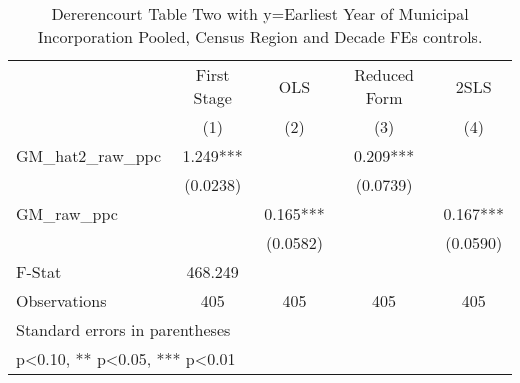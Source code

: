 \begin{table}[htbp]\centering
\def\sym#1{\ifmmode^{#1}\else\(^{#1}\)\fi}
\caption{Dererencourt Table Two with y=Earliest Year of Municipal Incorporation  Pooled, Census Region and Decade FEs controls.}
\begin{tabular}{l*{4}{c}}
\toprule
                    & First Stage   &         OLS   &Reduced Form   &        2SLS   \\
                    &\multicolumn{1}{c}{(1)}   &\multicolumn{1}{c}{(2)}   &\multicolumn{1}{c}{(3)}   &\multicolumn{1}{c}{(4)}   \\
\midrule
GM\_hat2\_raw\_ppc     &       1.249***&               &       0.209***&               \\
                    &    (0.0238)   &               &    (0.0739)   &               \\
\addlinespace
GM\_raw\_ppc          &               &       0.165***&               &       0.167***\\
                    &               &    (0.0582)   &               &    (0.0590)   \\
\midrule
F-Stat              &     468.249   &               &               &               \\
Observations        &         405   &         405   &         405   &         405   \\
\bottomrule
\multicolumn{5}{l}{\footnotesize Standard errors in parentheses}\\
\multicolumn{5}{l}{\footnotesize * p<0.10, ** p<0.05, *** p<0.01}\\
\end{tabular}
\end{table}
